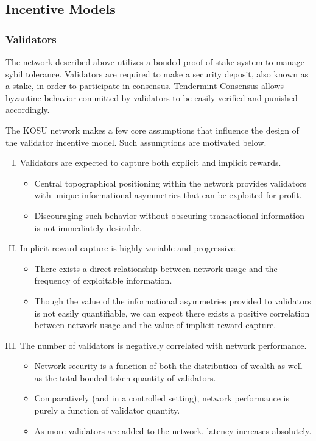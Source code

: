\documentclass[10pt]{article}
\begin{document}
\subsection{Incentive Models}\label{incentive-models}

\subsubsection{Validators}\label{incentive-models-validators}
The network described above utilizes a bonded proof-of-stake system to manage sybil tolerance. Validators are required to make a security deposit, also known as a stake, in order to participate in consensus. Tendermint Consensus allows byzantine behavior committed by validators to be easily verified and punished accordingly. 
\medskip

The KOSU network makes a few core assumptions that influence the design of the validator incentive model. Such assumptions are motivated below.

\begin{enumerate}[I.]
  \item Validators are expected to capture both explicit and implicit rewards.
  \begin{itemize}
    \item Central topographical positioning within the network provides validators with unique informational asymmetries that can be exploited for profit.
    \item Discouraging such behavior without obscuring transactional information is not immediately desirable.
  \end{itemize}
  \item Implicit reward capture is highly variable and progressive.
  \begin{itemize}
    \item There exists a direct relationship between network usage and the frequency of exploitable information.
    \item Though the value of the informational asymmetries provided to validators is not easily quantifiable, we can expect there exists a positive correlation between network usage and the value of implicit reward capture.
  \end{itemize}
  \item The number of validators is negatively correlated with network performance.
  \begin{itemize}
    \item Network security is a function of both the distribution of wealth as well as the total bonded token quantity of validators.
    \item Comparatively (and in a controlled setting), network performance is purely a function of validator quantity.
    \item As more validators are added to the network, latency increases absolutely.
  \end{itemize}
\end{enumerate}
\end{document}
